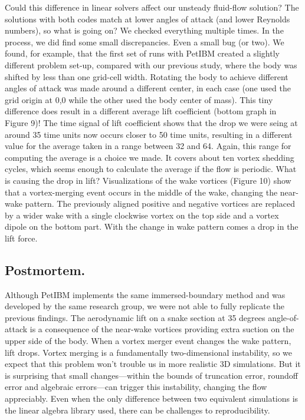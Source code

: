 \documentclass[9pt,twocolumn,twoside]{article}
\newlength{\up}
\begin{document}
Could this difference in linear solvers affect our unsteady fluid-flow solution? 
The solutions with both codes match at lower angles of attack (and lower Reynolds numbers), so what is going on? 
We checked everything multiple times. 
In the process, we did find some small discrepancies. 
Even a small bug (or two).
We found, for example, that the first set of runs with PetIBM created a slightly different problem set-up, compared with our previous study, where the body was shifted by less than one grid-cell width. 
Rotating the body to achieve different angles of attack was made around a different center, in each case (one used the grid origin at 0,0 while the other used the body center of mass). 
This tiny difference does result in a different average lift coefficient (bottom graph in Figure 9)! 
The time signal of lift coefficient shows that the drop we were seing at around 35 time units now occurs closer to 50 time units, resulting in a different value for the average taken in a range between 32 and 64. 
Again, this range for computing the average is a choice we made. 
It covers about ten vortex shedding cycles, which seems enough to calculate the average if the flow is periodic.
What is causing the drop in lift? 
Visualizations of the wake vortices (Figure 10) show that a vortex-merging event occurs in the middle of the wake, changing the near-wake pattern. 
The previously aligned positive and negative vortices are replaced by a wider wake with a single clockwise vortex on the top side and a vortex dipole on the bottom part. 
With the change in wake pattern comes a drop in the lift force. 

\subsection*{Postmortem.} 
Although PetIBM implements the same immersed-boundary method and was developed by the same research group, we were not able to fully replicate the previous findings. 
The aerodynamic lift on a snake section at 35 degrees angle-of-attack is a consequence of the near-wake vortices providing extra suction on the upper side of the body. 
When a vortex merger event changes the wake pattern, lift drops. 
Vortex merging is a fundamentally two-dimensional instability, so we expect that this problem won't trouble us in more realistic 3D simulations. 
But it is surprising that small changes---within the bounds of truncation error, roundoff error and algebraic errors---can trigger this instability, changing the flow appreciably. 
Even when the only difference between two equivalent simulations is the linear algebra library used, there can be challenges to reproducibility.
\end{document}
